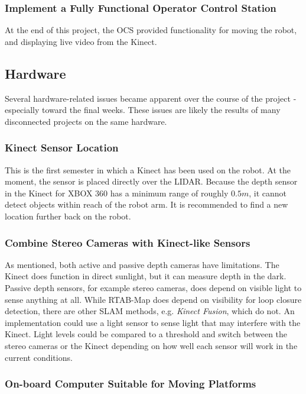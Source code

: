 \subsubsection{Implement a Fully Functional Operator Control Station}

At the end of this project, the \ac{OCS} provided functionality for moving the robot, and displaying live video from the Kinect. 

\subsection{Hardware}

Several hardware-related issues became apparent over the course of the project - especially toward the final weeks. These issues are likely the results of many disconnected projects on the same hardware.

\subsubsection{Kinect Sensor Location}

This is the first semester in which a Kinect has been used on the robot. At the moment, the sensor is placed directly over the \ac{LIDAR}. Because the depth sensor in the Kinect for XBOX 360 has a minimum range of roughly $0.5 m$, it cannot detect objects within reach of the robot arm. It is recommended to find a new location further back on the robot. 

\subsubsection{Combine Stereo Cameras with Kinect-like Sensors}

As mentioned, both active and passive depth cameras have limitations. The Kinect does function in direct sunlight, but it can measure depth in the dark. Passive depth sensors, for example stereo cameras, does depend on visible light to sense anything at all. While RTAB-Map does depend on visibility for loop closure detection, there are  other \ac{SLAM} methods, e.g. \textit{Kinect Fusion}, which do not. An implementation could use a light sensor to sense light that may interfere with the Kinect. Light levels could be compared to a threshold and switch between the stereo cameras or the Kinect depending on how well each sensor will work in the current conditions. 

\subsubsection{On-board Computer Suitable for Moving Platforms}


